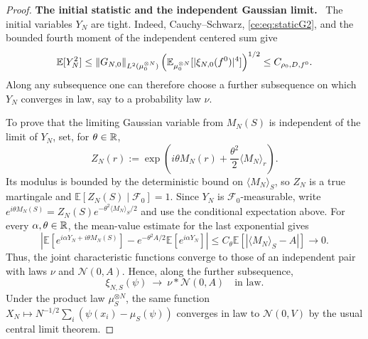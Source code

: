 \documentclass[11pt,reqno]{amsart}
\numberwithin{equation}{section}
\theoremstyle{plain}
\theoremstyle{remark}
\DeclarePairedDelimiter{\norm}{\lVert}{\rVert}
\newcommand{\E}{\mathbb E}\newcommand{\Q}{\mathbb Q}\newcommand{\Pb}{\mathbb P}
\newcommand{\parheading}[1]{\par\medskip\noindent\textbf{#1}\ }
\begin{document}
\begin{proof}
\parheading{The initial statistic and the independent Gaussian limit.}
The initial variables $Y_N$ are tight. Indeed, Cauchy--Schwarz, \eqref{ce:eq:staticG2}, and the bounded fourth moment of the independent centered sum give
\begin{equation}\label{ce:eq:initial-statistic-tightness}
 \E[Y_N^2]\le\norm{G_{N,0}}_{L^2(\mu_0^{\otimes N})}
 \left(\E_{\mu_0^{\otimes N}}[|\xi_{N,0}(f^0)|^4]\right)^{1/2}\le C_{\rho_0,D,f^0}.
\end{equation} Along any subsequence one can therefore choose a further subsequence on which $Y_N$ converges in law, say to a probability law $\nu$.

To prove that the limiting Gaussian variable from $M_N(S)$ is independent of the limit of $Y_N$, set, for $\theta\in\mathbb R$,
\begin{equation}\label{ce:eq:complexmart}
 Z_N(r):=\exp\!\left(i\theta M_N(r)+\frac{\theta^2}{2}\langle M_N\rangle_r\right).
\end{equation}
Its modulus is bounded by the deterministic bound on $\langle M_N\rangle_S$, so $Z_N$ is a true martingale and
$\E[Z_N(S)\mid\mathcal F_0]=1$. Since $Y_N$ is $\mathcal F_0$-measurable, write $e^{i\theta M_N(S)}=Z_N(S)e^{-\theta^2\langle M_N\rangle_S/2}$ and use the conditional expectation above. For every $\alpha,\theta\in\mathbb R$, the mean-value estimate for the last exponential gives
\begin{equation}\label{ce:eq:factorizationestimate}
 \left|\E[e^{i\alpha Y_N+i\theta M_N(S)}]-e^{-\theta^2A/2}\E[e^{i\alpha Y_N}]\right|
 \le C_\theta\E[|\langle M_N\rangle_S-A|]\longrightarrow0.
\end{equation}
Thus, the joint characteristic functions converge to those of an independent pair with laws $\nu$ and $\mathcal N(0,A)$. Hence, along the further subsequence,
\begin{equation}\label{ce:eq:convolutionlimit}
 \xi_{N,S}(\psi)\ \longrightarrow\ \nu*\mathcal N(0,A)\quad\text{in law}.
\end{equation}
Under the product law $\mu_S^{\otimes N}$, the same function $X_N\mapsto N^{-1/2}\sum_i(\psi(x_i)-\mu_S(\psi))$ converges in law to $\mathcal N(0,V)$ by the usual central limit theorem.


\end{proof}
\end{document}
